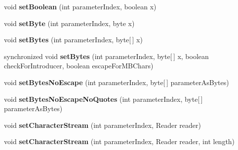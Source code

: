 \begin{DoxyCompactItemize}
void {\bfseries set\+Boolean} (int parameter\+Index, boolean x)
\item 
\mbox{\label{classcom_1_1mysql_1_1cj_1_1_client_prepared_query_bindings_a1410021de9d65ccf267c055166ad1b16}} 
void {\bfseries set\+Byte} (int parameter\+Index, byte x)
\item 
\mbox{\label{classcom_1_1mysql_1_1cj_1_1_client_prepared_query_bindings_ac055efd4d2a296c92fa5b262965af6ac}} 
void {\bfseries set\+Bytes} (int parameter\+Index, byte\mbox{[}$\,$\mbox{]} x)
\item 
\mbox{\label{classcom_1_1mysql_1_1cj_1_1_client_prepared_query_bindings_af7dc14bb72423ebe29bff74817f3b011}} 
synchronized void {\bfseries set\+Bytes} (int parameter\+Index, byte\mbox{[}$\,$\mbox{]} x, boolean check\+For\+Introducer, boolean escape\+For\+M\+B\+Chars)
\item 
\mbox{\label{classcom_1_1mysql_1_1cj_1_1_client_prepared_query_bindings_a2a1630dfc22ebabff166c2efa046fa28}} 
void {\bfseries set\+Bytes\+No\+Escape} (int parameter\+Index, byte\mbox{[}$\,$\mbox{]} parameter\+As\+Bytes)
\item 
\mbox{\label{classcom_1_1mysql_1_1cj_1_1_client_prepared_query_bindings_a8abd01905c6ec12e0d41c7e4d3dab57c}} 
void {\bfseries set\+Bytes\+No\+Escape\+No\+Quotes} (int parameter\+Index, byte\mbox{[}$\,$\mbox{]} parameter\+As\+Bytes)
\item 
\mbox{\label{classcom_1_1mysql_1_1cj_1_1_client_prepared_query_bindings_ab3c84f3033d28fe1c03cd463079935dc}} 
void {\bfseries set\+Character\+Stream} (int parameter\+Index, Reader reader)
\item 
\mbox{\label{classcom_1_1mysql_1_1cj_1_1_client_prepared_query_bindings_ac095e4d977342243421475f9fc0d52b6}} 
void {\bfseries set\+Character\+Stream} (int parameter\+Index, Reader reader, int length)
\item 

\end{DoxyCompactItemize}
